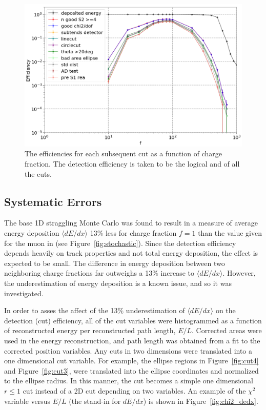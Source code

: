 \begin{figure}[htbp]
\begin{center}
\includegraphics[width=\textwidth]{figures/lips/eff.png}
\caption{The efficiencies for each subsequent cut as a function of charge fraction. The detection efficiency is taken to be the logical and of all the cuts.}
\label{fig:eff}
\end{center}
\end{figure}

\FloatBarrier
\subsection{Systematic Errors}
The base 1D straggling Monte Carlo was found to result in a measure of average energy deposition $\langle dE/dx \rangle$ 13\% less for charge fraction $f=1$ than the value given for the muon in \cite{PDG} (see Figure~\ref{fig:stochastic}). Since the detection efficiency depends heavily on track properties and not total energy deposition, the effect is expected to be small. The difference in energy deposition between two neighboring charge fractions far outweighs a 13\% increase to $\langle dE/dx \rangle$. However, the underestimation of energy deposition is a known issue, and so it was investigated. 

In order to asses the affect of the 13\% underestimation of $\langle dE/dx \rangle$ on the detection (cut) efficiency, all of the cut variables were histogrammed as a function of reconstructed energy per reconstructed path length, $E/L$. Corrected areas were used in the energy reconstruction, and path length was obtained from a fit to the corrected position variables. Any cuts in two dimensions were translated into a one dimensional cut variable. For example, the ellipse regions in Figure~\ref{fig:cut4} and Figure~\ref{fig:cut3}, were translated into the ellipse coordinates and normalized to the ellipse radius. In this manner, the cut becomes a simple one dimensional $r \leqslant 1$ cut instead of a 2D cut depending on two variables. An example of the $\chi^{2}$ variable versus $E/L$ (the stand-in for $dE/dx$) is shown in Figure~\ref{fig:chi2_dedx}. 

